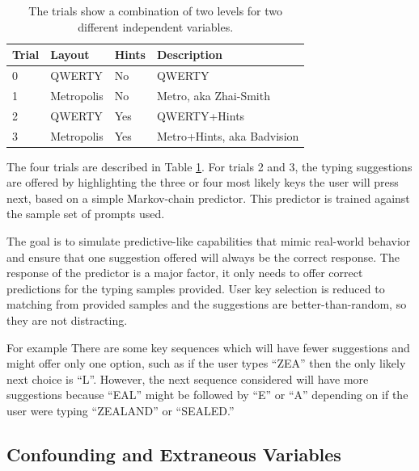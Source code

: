 \documentclass[english]{vgtc}
\begin{document}
\begin{table}[!htb]
  \centering
  \begin{tabular}{@{}llll@{}}
  \toprule
  Trial & Layout     & Hints & Description \\ \midrule
  0     & QWERTY     & No    & QWERTY    \\
  1     & Metropolis & No    & Metro, aka Zhai-Smith  \\
  2     & QWERTY     & Yes   & QWERTY+Hints  \\
  3     & Metropolis & Yes   & Metro+Hints, aka Badvision   \\ \bottomrule
  \end{tabular}
  \caption{The trials show a combination of two levels for two different independent variables.}
  \label{table:trials}
\end{table}

The four trials are described in Table \ref{table:trials}. For trials
2 and 3, the typing suggestions are offered by highlighting the three
or four most likely keys the user will press next, based on a simple
Markov-chain predictor.  This predictor is  trained against the sample 
set of prompts used. 

The goal is to simulate predictive-like capabilities that
mimic real-world behavior and ensure that one suggestion offered will
always be the correct response. The response of the predictor is a
major factor, it only needs to offer correct predictions
for the typing samples provided.  User key selection is
reduced to matching from provided samples and the suggestions are
better-than-random, so they are not distracting. 

For example There are some key sequences which will have fewer 
suggestions and might offer only one option, such as if the user types 
\textquotedblleft ZEA\textquotedblright{}
then the only likely next choice is \textquotedblleft L\textquotedblright .
However, the next sequence considered will have more suggestions because
\textquotedblleft EAL\textquotedblright{} might be followed by \textquotedblleft E\textquotedblright{}
or \textquotedblleft A\textquotedblright{} depending on if the user
were typing \textquotedblleft ZEALAND\textquotedblright{} or \textquotedblleft SEALED.\textquotedblright{} 

\subsection{Confounding and Extraneous Variables}
\end{document}
